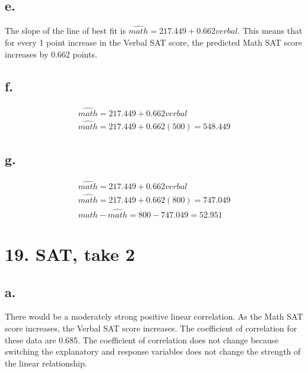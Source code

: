 \documentclass{article}
\begin{document}
\subsection*{e.}
The slope of the line of best fit is $\widehat{math} = 217.449 + 0.662verbal$.
This means that for every 1 point increase in the Verbal SAT score, the
predicted Math SAT score increases by 0.662 points. 

\subsection*{f.}
\begin{gather}
    \widehat{math} = 217.449 + 0.662verbal \\
    \widehat{math} = 217.449 + 0.662(500) = 548.449
\end{gather}

\subsection*{g.}
\begin{gather}
    \widehat{math} = 217.449 + 0.662verbal \\
    \widehat{math} = 217.449 + 0.662(800) = 747.049 \\
    math - \widehat{math} = 800 - 747.049 = 52.951
\end{gather}

\section*{19. SAT, take 2}

\subsection*{a.}
There would be a moderately strong positive linear correlation. As the Math SAT
score increases, the Verbal SAT score increases. The coefficient of correlation
for these data are 0.685. The coefficient of correlation does not change
because switching the explanatory and response variables does not change the
strength of the linear relationship.
\end{document}
